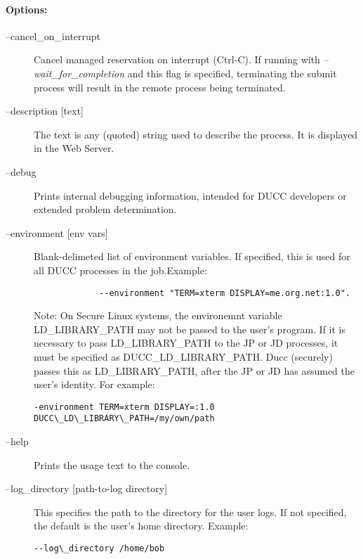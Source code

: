     \paragraph{Options:}
    \begin{description}
    
        \item[--cancel\_on\_interrupt ] Cancel managed reservation on interrupt
          (Ctrl-C).  If running with {\em--wait\_for\_completion} and this flag is specified,
          terminating the submit process will result in the remote process being terminated.

        \item[--description {[text]}] The text is any (quoted) string used to describe the process. It is
          displayed in the Web Server.

        \item[--debug ] Prints internal debugging information, intended for DUCC developers or
          extended problem determination.

        \item[--environment {[env vars]}] Blank-delimeted list of environment variables. If
          specified, this is used for all DUCC processes in the job.Example:
\begin{verbatim}
             --environment "TERM=xterm DISPLAY=me.org.net:1.0". 
\end{verbatim}
          
          Note: On Secure Linux systems, the environemnt variable 
          LD\_LIBRARY\_PATH may not be passed to the user's program. If it is 
          necessary to pass LD\_LIBRARY\_PATH to the JP or JD processes, it must be 
          specified as DUCC\_LD\_LIBRARY\_PATH. Ducc (securely) passes this as 
          LD\_LIBRARY\_PATH, after the JP or JD has assumed the user's identity. For 
          example: 
             \begin{verbatim}
-environment TERM=xterm DISPLAY=:1.0 DUCC\_LD\_LIBRARY\_PATH=/my/own/path
            \end{verbatim}

        \item[--help] Prints the usage text to the console.

        \item[--log\_directory {[path-to-log directory]} ]

          This specifies the path to the directory for the user logs. If not specified, the default is the 
          user's home directory. Example: 
\begin{verbatim}
--log\_directory /home/bob 
\end{verbatim}
          

\end{description}
